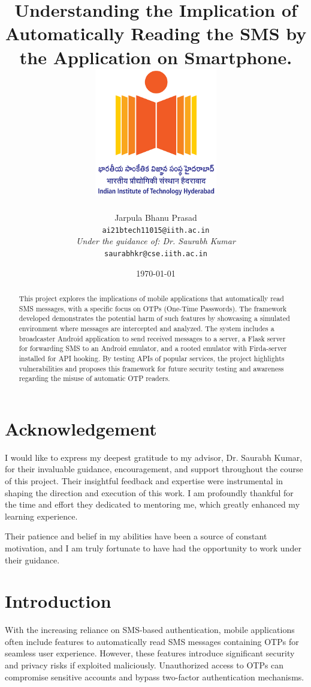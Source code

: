 \documentclass[a4paper,12pt]{article}
\title{
    Understanding the Implication of Automatically Reading the SMS by the Application on Smartphone.
    \vfill
    \includegraphics[width=0.4\textwidth]{../images/iith_logo.png}
    \vfill
    }
\author{Jarpula Bhanu Prasad \\ 
\texttt{ai21btech11015@iith.ac.in} \\ 
\textit{Under the guidance of: Dr. Saurabh Kumar} \\ 
\texttt{saurabhkr@cse.iith.ac.in}}
\date{\today}
\begin{document}
\maketitle
\pagebreak

\begin{abstract}
    This project explores the implications of mobile applications that automatically read SMS messages, with a specific focus on OTPs (One-Time Passwords). The framework developed demonstrates the potential harm of such features by showcasing a simulated environment where messages are intercepted and analyzed. The system includes a broadcaster Android application to send received messages to a server, a Flask server for forwarding SMS to an Android emulator, and a rooted emulator with Firda-server installed for API hooking. By testing APIs of popular services, the project highlights vulnerabilities and proposes this framework for future security testing and awareness regarding the misuse of automatic OTP readers.
\end{abstract}

\vfill

\tableofcontents

\vfill

\section*{Acknowledgement}
I would like to express my deepest gratitude to my advisor, Dr. Saurabh Kumar, for their invaluable guidance, encouragement, and support throughout the course of this project. Their insightful feedback and expertise were instrumental in shaping the direction and execution of this work. I am profoundly thankful for the time and effort they dedicated to mentoring me, which greatly enhanced my learning experience.

Their patience and belief in my abilities have been a source of constant motivation, and I am truly fortunate to have had the opportunity to work under their guidance.
\pagebreak

\section{Introduction}
With the increasing reliance on SMS-based authentication, mobile applications often include features to automatically read SMS messages containing OTPs for seamless user experience. However, these features introduce significant security and privacy risks if exploited maliciously. Unauthorized access to OTPs can compromise sensitive accounts and bypass two-factor authentication mechanisms.
\end{document}
